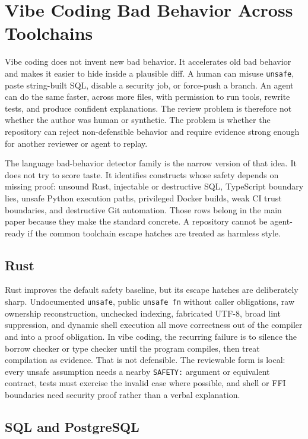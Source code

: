 \section{Vibe Coding Bad Behavior Across Toolchains}

Vibe coding does not invent new bad behavior. It accelerates old bad behavior and makes it easier to hide inside a plausible diff. A human can misuse \texttt{unsafe}, paste string-built SQL, disable a security job, or force-push a branch. An agent can do the same faster, across more files, with permission to run tools, rewrite tests, and produce confident explanations. The review problem is therefore not whether the author was human or synthetic. The problem is whether the repository can reject non-defensible behavior and require evidence strong enough for another reviewer or agent to replay.

The language bad-behavior detector family is the narrow version of that idea. It does not try to score taste. It identifies constructs whose safety depends on missing proof: unsound Rust, injectable or destructive SQL, TypeScript boundary lies, unsafe Python execution paths, privileged Docker builds, weak CI trust boundaries, and destructive Git automation. Those rows belong in the main paper because they make the standard concrete. A repository cannot be agent-ready if the common toolchain escape hatches are treated as harmless style.

\subsection{Rust}

Rust improves the default safety baseline, but its escape hatches are deliberately sharp. Undocumented \texttt{unsafe}, public \texttt{unsafe fn} without caller obligations, raw ownership reconstruction, unchecked indexing, fabricated UTF-8, broad lint suppression, and dynamic shell execution all move correctness out of the compiler and into a proof obligation. In vibe coding, the recurring failure is to silence the borrow checker or type checker until the program compiles, then treat compilation as evidence. That is not defensible. The reviewable form is local: every unsafe assumption needs a nearby \texttt{SAFETY:} argument or equivalent contract, tests must exercise the invalid case where possible, and shell or FFI boundaries need security proof rather than a verbal explanation.

\subsection{SQL and PostgreSQL}

